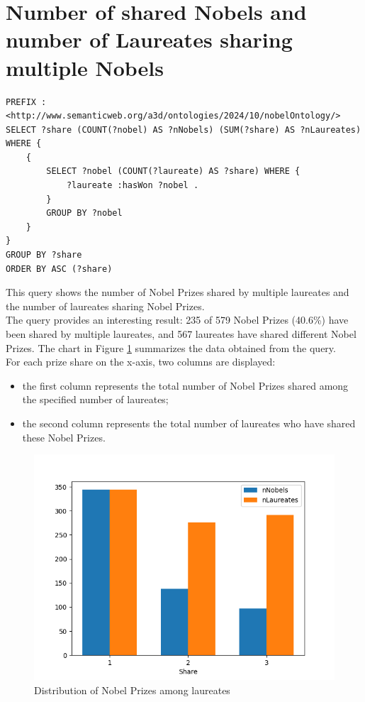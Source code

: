 \documentclass{article}
\begin{document}
\newpage

\section{Number of shared Nobels and number of Laureates sharing multiple Nobels}

\begin{lstlisting}
PREFIX : <http://www.semanticweb.org/a3d/ontologies/2024/10/nobelOntology/>
SELECT ?share (COUNT(?nobel) AS ?nNobels) (SUM(?share) AS ?nLaureates) WHERE {
    {
        SELECT ?nobel (COUNT(?laureate) AS ?share) WHERE {
            ?laureate :hasWon ?nobel .
        }
        GROUP BY ?nobel
    }
}
GROUP BY ?share
ORDER BY ASC (?share)
\end{lstlisting}

This query shows the number of Nobel Prizes shared by multiple laureates
and the number of laureates sharing Nobel Prizes.\\
The query provides an interesting result: 235 of 579 Nobel Prizes (40.6\%) have
been shared by multiple laureates, and 567 laureates have shared different Nobel Prizes.
The chart in Figure \ref{fig:prizeShare} summarizes the data obtained from the query.\\
For each prize share on the x-axis, two columns are displayed:
\begin{itemize}
	\item the first column represents the total number of Nobel Prizes shared among the specified number of laureates;
	\item the second column represents the total number of laureates who have shared these Nobel Prizes.
\end{itemize}

\begin{figure}[H]
	\centering
	\includegraphics[width=0.7\linewidth]{../queries/plots/nobelShare.png}
	\caption{Distribution of Nobel Prizes among laureates}
	\label{fig:prizeShare}
\end{figure}
\end{document}
